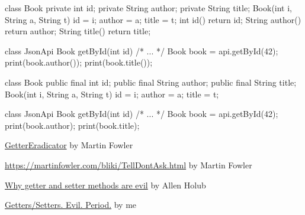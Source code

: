 \documentclass{article}
\begin{document}
\begin{pptWide}{2}
{\small\begin{ffcode}
class Book {
  private int id;
  private String author;
  private String title;
  Book(int i, String a, String t)
    { id = i; author = a; title = t; }
  int id() { return id; }
  String author() { return author; }
  String title() { return title; }
}
\end{ffcode}
}
\par\columnbreak\par
{\small\begin{ffcode}
class JsonApi {
  Book getById(int id) { /* ... */ }
}
Book book = api.getById(42);
print(book.author());
print(book.title());
\end{ffcode}
}
\end{pptWide}
\par
\plush{}

\begin{pptWide}{2}
{\small\begin{ffcode}
class Book {
  public final int id;
  public final String author;
  public final String title;
  Book(int i, String a, String t)
    { id = i; author = a; title = t; }
}
\end{ffcode}
}
\par\columnbreak\par
{\small\begin{ffcode}
class JsonApi {
  Book getById(int id) { /* ... */ }
}
Book book = api.getById(42);
print(book.author);
print(book.title);
\end{ffcode}
}
\end{pptWide}
\par
\plush{}


\href{https://martinfowler.com/bliki/GetterEradicator.html}{GetterEradicator} by Martin Fowler

\href{TellDontAsk}{https://martinfowler.com/bliki/TellDontAsk.html} by Martin Fowler

\href{https://www.infoworld.com/article/2073723/why-getter-and-setter-methods-are-evil.html}{Why getter and setter methods are evil} by Allen Holub

\href{https://www.yegor256.com/2014/09/16/getters-and-setters-are-evil.html}{Getters/Setters. Evil. Period.} by me
\end{document}
